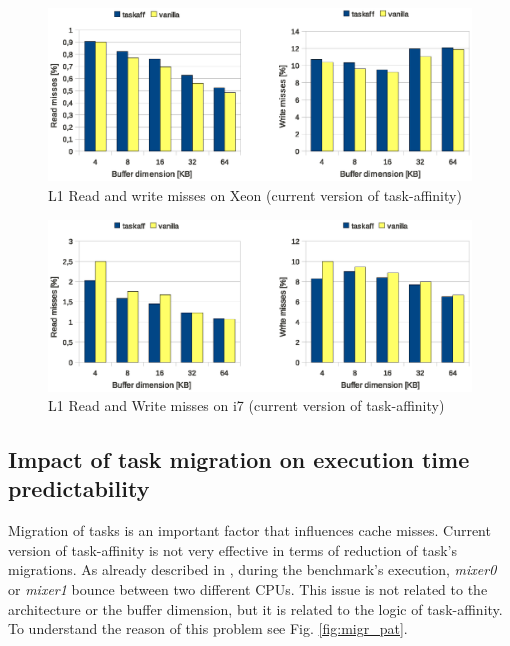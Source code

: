 \begin{figure}[htbp]
 \centering
  \includegraphics[width=\widefigure]{images/cache_miss/l1_load_store_Xeon.eps}
  \caption{L1 Read and write misses on Xeon (current version of task-affinity)}
 \label{fig:l1_load_store_Xeon}
\end{figure}

\begin{figure}[htbp]
 \centering
  \includegraphics[width=\widefigure]{images/cache_miss/l1_load_store_i7.eps}
 \caption{L1 Read and Write misses on i7 (current version of task-affinity)}
 \label{fig:old_l1_load_store_i7}
\end{figure}

\subsection{Impact of task migration on execution time predictability}

Migration of tasks is an important factor that influences cache misses. Current version of task-affinity is not very effective in terms of reduction 
of task's migrations. As already described in \cite{lcs}, during the benchmark's execution, \textit{mixer0} or \textit{mixer1} bounce between two 
different CPUs. This issue is not related to the architecture or the buffer dimension, but it is related to the logic of task-affinity. To understand 
the reason of this problem see Fig. \ref{fig:migr_pat}.

